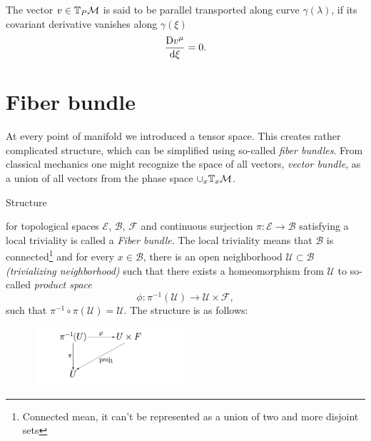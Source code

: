 The vector $v\in \mathbb{T}_P\mathcal{M}$ is said to be parallel transported along curve $\gamma(\lambda)$, if its covariant derivative vanishes along $\gamma(\xi)$
\begin{equation}
    \frac{\mathrm{D} v^\mu}{\mathrm{d} \xi}=0.
\end{equation}

\section{Fiber bundle}
\label{sec:bundleDef}
At every point of manifold we introduced a tensor space. This creates rather complicated structure, which can be simplified using so-called \emph{fiber bundles}. From classical mechanics one might recognize the space of all vectors, \emph{vector bundle}, as a union of all vectors from the phase space $\cup_x\mathbb{T}_x\mathcal{M}$.
\begin{definition}
    \label{def:fiberBundle}
    Structure 
\begin{center}
\end{center}
    for topological spaces $\mathcal{E}$, $\mathcal{B}$, $\mathcal F$ and continuous surjection $\pi: \mathcal{E}\rightarrow \mathcal{B}$ satisfying a local triviality is called a \emph{Fiber bundle}. The local triviality means that $\mathcal{B}$ is connected\footnote{Connected mean, it can't be represented as a union of two and more disjoint sets} and for every $x\in \mathcal{B}$, there is an open neighborhood $\mathcal{U}\subset \mathcal{B}$ \emph{(trivializing neighborhood)} such that there exists a homeomorphism from $\mathcal{U}$ to so-called \emph{product space}
    $$\phi: \pi^{-1}(\mathcal{U})\rightarrow \mathcal{U}\times \mathcal{F},$$
    such that $\pi^{-1}\circ \pi(\mathcal{U})=\mathcal{U}$.
    The structure is as follows: 
    \begin{figure}[H]
        \centering
        \includegraphics[width=0.5\textwidth]{../img/bundle.png}
        \caption{}
    \end{figure}
\end{definition}
